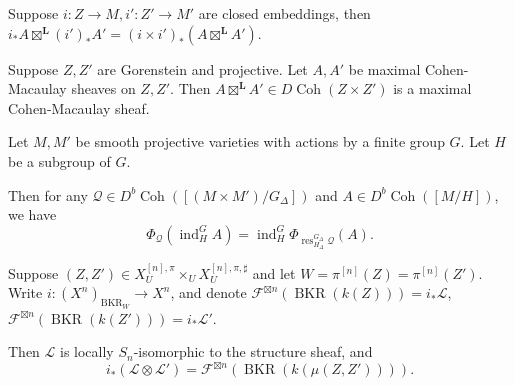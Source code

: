 \documentclass[10pt,a4paper]{amsart}
\begin{document}
    \begin{lemma}\label{closed_embeddings_outer}
        Suppose $i:Z\to M,i':Z'\to M'$ are closed embeddings, then $i_\ast A\boxtimes^{\mathbf L}(i')_\ast A'=(i\times i')_\ast(A\boxtimes^{\mathbf L}A')$.
    \end{lemma}

    \begin{proposition}\label{mcm_outer_tensor}
        Suppose $Z,Z'$ are Gorenstein and projective.
        Let $A,A'$ be maximal Cohen-Macaulay sheaves on $Z,Z'$.
        Then $A\boxtimes^{\mathbf L}A'\in D\operatorname{Coh}(Z\times Z')$ is a maximal Cohen-Macaulay sheaf.
    \end{proposition}

    \begin{lemma}\label{induction_FM}
        Let $M,M'$ be smooth projective varieties with actions by a finite group $G$.
        Let $H$ be a subgroup of $G$.

        Then for any $\mathcal Q\in D^b\operatorname{Coh}([(M\times M')/G_\Delta])$ and $A\in D^b\operatorname{Coh}([M/H])$, we have
        \[\Phi_{\mathcal Q}(\operatorname{ind}_H^GA)= \operatorname{ind}_H^G\Phi_{\operatorname{res}^{G_\Delta}_{H_\Delta}\mathcal Q}(A).\]
    \end{lemma}

    \begin{corollary}
        Suppose $(Z,Z')\in X^{[n],\pi}_U\times_UX^{[n],\pi,\sharp}_U$ and let $W=\pi^{[n]}(Z)=\pi^{[n]}(Z')$.
        Write $i:(X^n)_{\operatorname{BKR}_W}\to X^n$, and denote $\mathcal F^{\boxtimes n}(\operatorname{BKR}(k(Z)))=i_\ast \mathcal L$, $\mathcal F^{\boxtimes n}(\operatorname{BKR}(k(Z')))=i_\ast \mathcal L'$.

        Then $\mathcal L$ is locally $S_n$-isomorphic to the structure sheaf, and
        \[i_\ast(\mathcal L\otimes\mathcal L')=\mathcal F^{\boxtimes n}(\operatorname{BKR}(k(\mu(Z,Z')))).\]
    \end{corollary}
\end{document}
